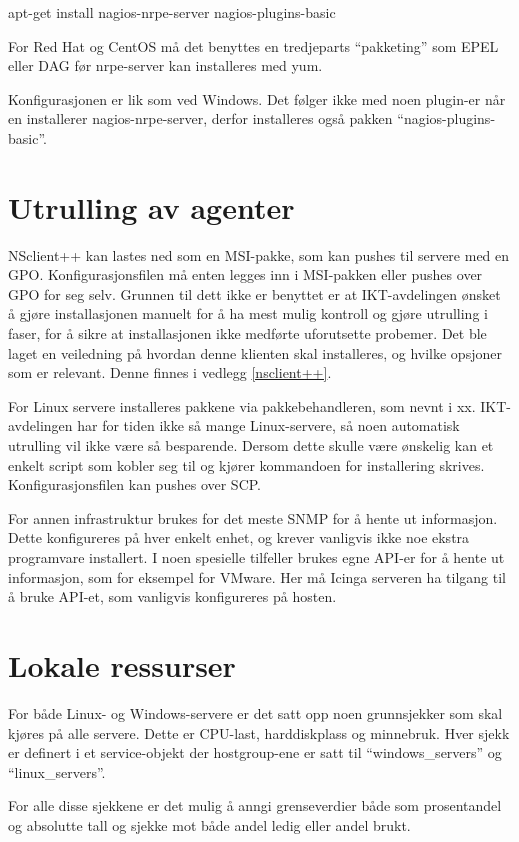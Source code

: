 apt-get install nagios-nrpe-server nagios-plugins-basic

For Red Hat og CentOS må det benyttes en tredjeparts “pakketing” som EPEL eller DAG før nrpe-server kan installeres med yum.

Konfigurasjonen er lik som ved Windows. Det følger ikke med noen plugin-er når en installerer nagios-nrpe-server, derfor installeres også pakken “nagios-plugins-basic”.

\section{Utrulling av agenter}
NSclient++ kan lastes ned som en MSI-pakke, som kan pushes til servere med en GPO. Konfigurasjonsfilen må enten legges inn i MSI-pakken eller pushes over GPO for seg selv. Grunnen til dett ikke er benyttet er at IKT-avdelingen ønsket å gjøre installasjonen manuelt for å ha mest mulig kontroll og gjøre utrulling i faser, for å sikre at installasjonen ikke medførte uforutsette probemer. Det ble laget en veiledning på hvordan denne klienten skal installeres, og hvilke opsjoner som er relevant. Denne finnes i vedlegg \ref{nsclient++}.

For Linux servere installeres pakkene via pakkebehandleren, som nevnt i xx. IKT-avdelingen har for tiden ikke så mange Linux-servere, så noen automatisk utrulling vil ikke være så besparende. Dersom dette skulle være ønskelig kan et enkelt script som kobler seg til og kjører kommandoen for installering skrives. Konfigurasjonsfilen kan pushes over SCP.

For annen infrastruktur brukes for det meste SNMP for å hente ut informasjon. Dette konfigureres på hver enkelt enhet, og krever vanligvis ikke noe ekstra programvare installert. I noen spesielle tilfeller brukes egne API-er for å hente ut informasjon, som for eksempel for VMware. Her må Icinga serveren ha tilgang til å bruke API-et, som vanligvis konfigureres på hosten.

\section{Lokale ressurser}
For både Linux- og Windows-servere er det satt opp noen grunnsjekker som skal kjøres på alle servere. Dette er CPU-last, harddiskplass og minnebruk. Hver sjekk er definert i et service-objekt der hostgroup-ene er satt til “windows\_servers” og “linux\_servers”. 

For alle disse sjekkene er det mulig å anngi grenseverdier både som prosentandel og absolutte tall og sjekke mot både andel ledig eller andel brukt. 
